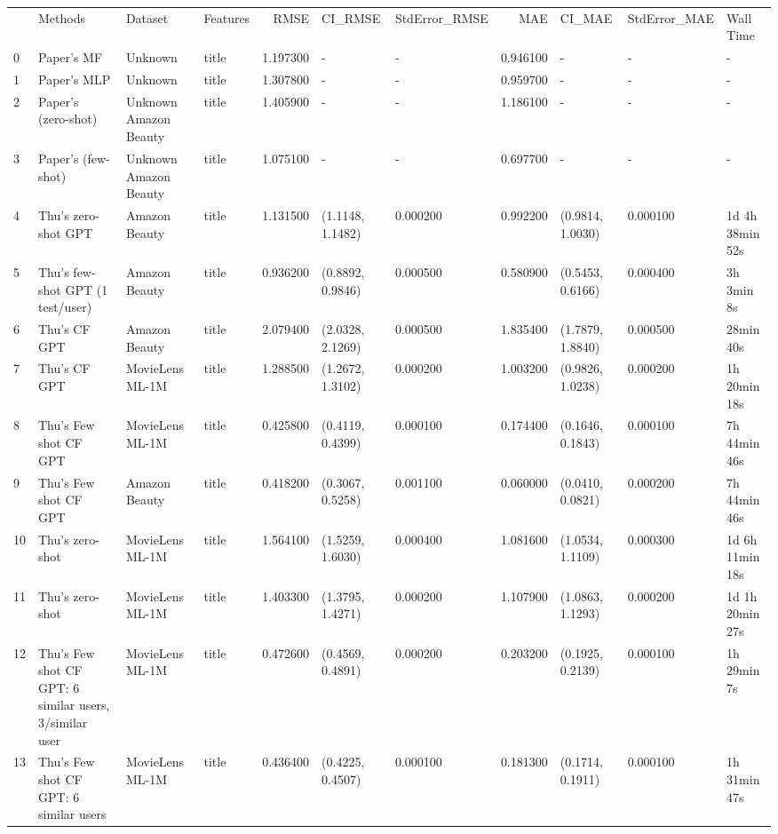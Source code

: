 \begin{tabular}{llllrllrlll}
 & Methods & Dataset & Features & RMSE & CI_RMSE & StdError_RMSE & MAE & CI_MAE & StdError_MAE & Wall Time \\
0 & Paper's MF & Unknown & title & 1.197300 & - & - & 0.946100 & - & - & - \\
1 & Paper's MLP & Unknown & title & 1.307800 & - & - & 0.959700 & - & - & - \\
2 & Paper's (zero-shot) & Unknown Amazon Beauty & title & 1.405900 & - & - & 1.186100 & - & - & - \\
3 & Paper's (few-shot) & Unknown Amazon Beauty & title & 1.075100 & - & - & 0.697700 & - & - & - \\
4 & Thu's zero-shot GPT & Amazon Beauty & title & 1.131500 & (1.1148, 1.1482) & 0.000200 & 0.992200 & (0.9814, 1.0030) & 0.000100 & 1d 4h 38min 52s \\
5 & Thu's few-shot GPT (1 test/user) & Amazon Beauty & title & 0.936200 & (0.8892, 0.9846) & 0.000500 & 0.580900 & (0.5453, 0.6166) & 0.000400 & 3h 3min 8s \\
6 & Thu's CF GPT & Amazon Beauty & title & 2.079400 & (2.0328, 2.1269) & 0.000500 & 1.835400 & (1.7879, 1.8840) & 0.000500 & 28min 40s \\
7 & Thu's CF GPT & MovieLens ML-1M & title & 1.288500 & (1.2672, 1.3102) & 0.000200 & 1.003200 & (0.9826, 1.0238) & 0.000200 & 1h 20min 18s \\
8 & Thu's Few shot CF GPT & MovieLens ML-1M & title & 0.425800 & (0.4119, 0.4399) & 0.000100 & 0.174400 & (0.1646, 0.1843) & 0.000100 & 7h 44min 46s \\
9 & Thu's Few shot CF GPT & Amazon Beauty & title & 0.418200 & (0.3067, 0.5258) & 0.001100 & 0.060000 & (0.0410, 0.0821) & 0.000200 & 7h 44min 46s \\
10 & Thu's zero-shot & MovieLens ML-1M & title & 1.564100 & (1.5259, 1.6030) & 0.000400 & 1.081600 & (1.0534, 1.1109) & 0.000300 & 1d 6h 11min 18s \\
11 & Thu's zero-shot & MovieLens ML-1M & title & 1.403300 & (1.3795, 1.4271) & 0.000200 & 1.107900 & (1.0863, 1.1293) & 0.000200 & 1d 1h 20min 27s \\
12 & Thu's Few shot CF GPT: 6 similar users, 3/similar user & MovieLens ML-1M & title & 0.472600 & (0.4569, 0.4891) & 0.000200 & 0.203200 & (0.1925, 0.2139) & 0.000100 & 1h 29min 7s \\
13 & Thu's Few shot CF GPT: 6 similar users & MovieLens ML-1M & title & 0.436400 & (0.4225, 0.4507) & 0.000100 & 0.181300 & (0.1714, 0.1911) & 0.000100 & 1h 31min 47s \\

\end{tabular}
